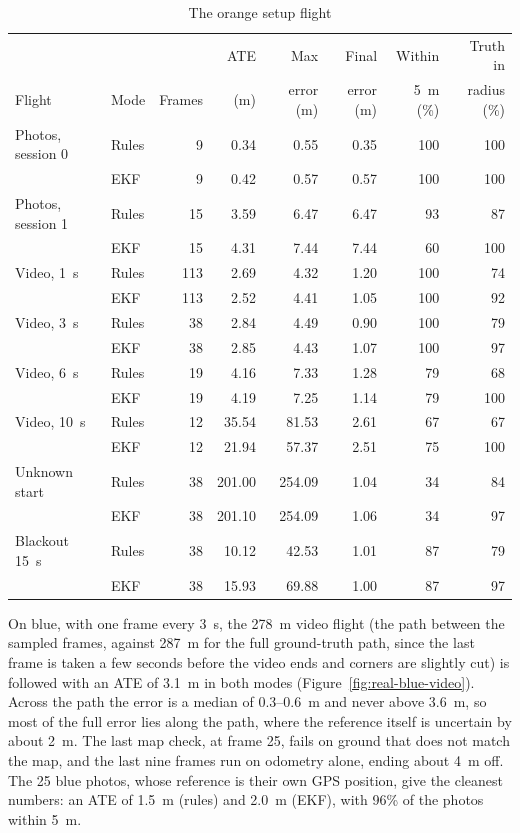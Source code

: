 \documentclass[english, Lau, oneside]{sapthesis}%
\begin{document}
\begin{table}[!htbp]
  \centering
  \caption{The orange setup flight}
  \label{tab:real-orange}
  \footnotesize\setlength{\tabcolsep}{3.5pt}
  \begin{tabular}{llrrrrrr}
    \toprule
     & & & ATE & Max & Final & Within & Truth in \\
    Flight & Mode & Frames & (m) & error (m) & error (m) & 5~m (\%) & radius (\%) \\
    \midrule
    Photos, session 0 & Rules & 9 & 0.34 & 0.55 & 0.35 & 100 & 100 \\
     & EKF & 9 & 0.42 & 0.57 & 0.57 & 100 & 100 \\
    \addlinespace
    Photos, session 1 & Rules & 15 & 3.59 & 6.47 & 6.47 & 93 & 87 \\
     & EKF & 15 & 4.31 & 7.44 & 7.44 & 60 & 100 \\
    \addlinespace
    Video, 1~s & Rules & 113 & 2.69 & 4.32 & 1.20 & 100 & 74 \\
     & EKF & 113 & 2.52 & 4.41 & 1.05 & 100 & 92 \\
    \addlinespace
    Video, 3~s & Rules & 38 & 2.84 & 4.49 & 0.90 & 100 & 79 \\
     & EKF & 38 & 2.85 & 4.43 & 1.07 & 100 & 97 \\
    \addlinespace
    Video, 6~s & Rules & 19 & 4.16 & 7.33 & 1.28 & 79 & 68 \\
     & EKF & 19 & 4.19 & 7.25 & 1.14 & 79 & 100 \\
    \addlinespace
    Video, 10~s & Rules & 12 & 35.54 & 81.53 & 2.61 & 67 & 67 \\
     & EKF & 12 & 21.94 & 57.37 & 2.51 & 75 & 100 \\
    \addlinespace
    Unknown start & Rules & 38 & 201.00 & 254.09 & 1.04 & 34 & 84 \\
     & EKF & 38 & 201.10 & 254.09 & 1.06 & 34 & 97 \\
    \addlinespace
    Blackout 15~s & Rules & 38 & 10.12 & 42.53 & 1.01 & 87 & 79 \\
     & EKF & 38 & 15.93 & 69.88 & 1.00 & 87 & 97 \\
    \bottomrule
  \end{tabular}
\end{table}

On blue, with one frame every 3~s, the 278~m video flight (the path between the sampled frames, against 287~m for the full ground-truth path, since the last frame is taken a few seconds before the video ends and corners are slightly cut) is followed with an ATE of 3.1~m in both modes (Figure~\ref{fig:real-blue-video}). Across the path the error is a median of 0.3--0.6~m and never above 3.6~m, so most of the full error lies along the path, where the reference itself is uncertain by about 2~m. The last map check, at frame 25, fails on ground that does not match the map, and the last nine frames run on odometry alone, ending about 4~m off. The 25 blue photos, whose reference is their own GPS position, give the cleanest numbers: an ATE of 1.5~m (rules) and 2.0~m (EKF), with 96\% of the photos within 5~m.
\end{document}
